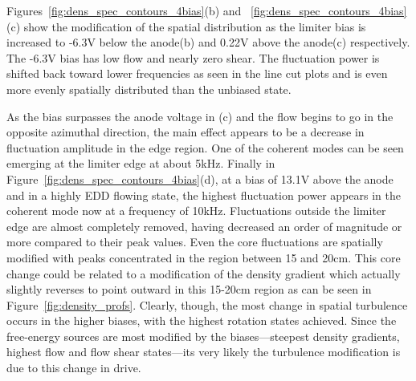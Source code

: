 \documentclass[aip,pop,amsmath,amssymb,reprint,superscriptaddress]{revtex4-1} %
\begin{document}
Figures~\ref{fig:dens_spec_contours_4bias}(b) and ~\ref{fig:dens_spec_contours_4bias}(c) show the modification of the spatial distribution as the limiter bias is increased to -6.3V below the anode(b) and 0.22V above the anode(c) respectively. The -6.3V bias has low flow and nearly zero shear. The fluctuation power is shifted back toward lower frequencies as seen in the line cut plots and is even more evenly spatially distributed than the unbiased state. 


As the bias surpasses the anode voltage in (c) and the flow begins to go in the opposite azimuthal direction, the main effect appears to be a decrease in fluctuation amplitude in the edge region. One of the coherent modes can be seen emerging at the limiter edge at about 5kHz. Finally in Figure~\ref{fig:dens_spec_contours_4bias}(d), at a bias of 13.1V above the anode and in a highly EDD flowing state, the highest fluctuation power appears in the coherent mode now at a frequency of 10kHz. Fluctuations outside the limiter edge are almost completely removed, having decreased an order of magnitude or more compared to their peak values. Even the core fluctuations are spatially modified with peaks concentrated in the region between 15 and 20cm. This core change could be related to a modification of the density gradient which actually slightly reverses to point outward in this 15-20cm region as can be seen in Figure~\ref{fig:density_profs}. Clearly, though, the most change in spatial turbulence occurs in the higher biases, with the highest rotation states achieved. Since the free-energy sources are most modified by the biases---steepest density gradients, highest flow and flow shear states---its very likely the turbulence modification is due to this change in drive.
\end{document}
